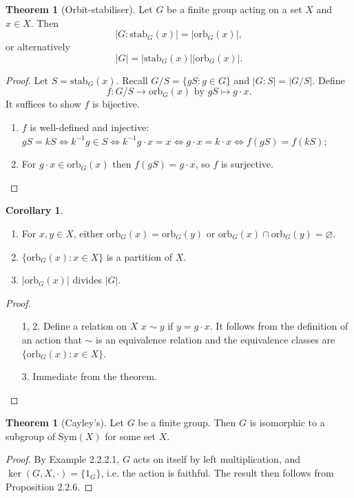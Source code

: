 \documentclass[a4paper]{article}
\newcommand{\orb}{\text{orb}}
\newcommand{\stab}{\text{stab}}
\newcommand{\Sym}{\text{Sym}}
\theoremstyle{definition}
\newtheorem{thm}[defn]{Theorem}
\newtheorem{coro}[defn]{Corollary}
\begin{document}
\begin{thm}[Orbit-stabiliser]
Let $G$ be a finite group acting on a set $X$ and $x\in X$. Then
\[
|G:\stab_G(x)|=|\orb_G(x)|,
\]
or alternatively
\[
|G|=|\stab_G(x)||\orb_G(x)|.
\]
\end{thm}
\begin{proof}
Let $S=\stab_G(x)$. Recall $G/S=\{gS:g\in G\}$ and $|G:S|=|G/S|$. Define
\[
f:G/S\rightarrow\orb_G(x) \text{ by } gS\mapsto g\cdot x.
\]
It suffices to show $f$ is bijective.
\begin{enumerate}
\item $f$ is well-defined and injective: $gS=kS\Leftrightarrow k^{-1}g\in S \Leftrightarrow k^{-1}g\cdot x=x \Leftrightarrow g\cdot x=k\cdot x\Leftrightarrow f(gS)=f(kS)$;
\item For $g\cdot x\in\orb_G(x)$ then $f(gS)=g\cdot x$, so $f$ is surjective.
\end{enumerate}
\end{proof}

\begin{coro}
\begin{enumerate}
\item For $x,y\in X$, either $\orb_G(x)=\orb_G(y)$ or $\orb_G(x)\cap \orb_G(y)=\varnothing$.
\item $\{\orb_G(x):x\in X\}$ is a partition of $X$.
\item $|\orb_G(x)|$ divides $|G|$.
\end{enumerate}
\end{coro}
\begin{proof}
\begin{enumerate}
\item[1, 2.] Define a relation on $X$ $x\sim y$ if $y=g\cdot x$. It follows from the definition of an action that $\sim$ is an equivalence relation and the equivalence classes are $\{\orb_G(x):x\in X\}$.
\item[3.] Immediate from the theorem.
\end{enumerate}
\end{proof}

\begin{thm}[Cayley's]
Let $G$ be a finite group. Then $G$ is isomorphic to a subgroup of $\Sym(X)$ for some set $X$.
\end{thm}
\begin{proof}
By Example 2.2.2.1, $G$ acts on itself by left multiplication, and $\ker(G,X,\cdot)=\{1_G\}$, i.e. the action is faithful. The result then follows from Proposition 2.2.6.
\end{proof}
\end{document}
